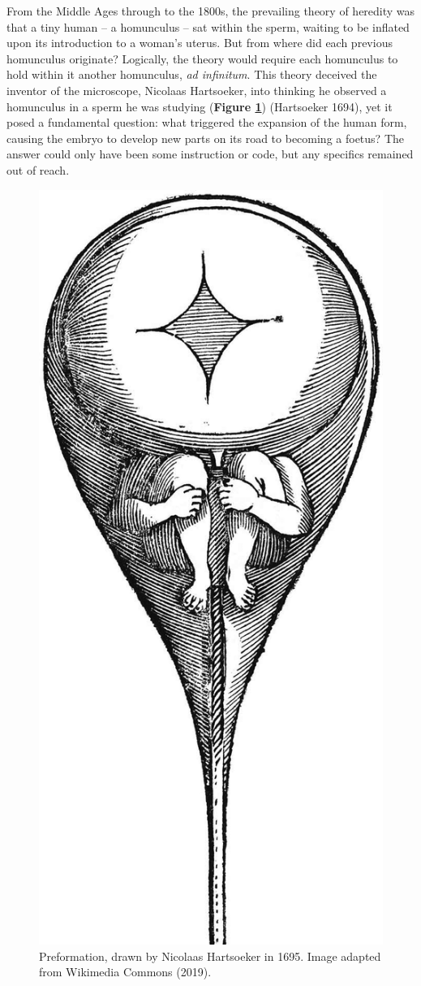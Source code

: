 \documentclass[
]{book}
\begin{document}
From the Middle Ages through to the 1800s, the prevailing theory of heredity was that a tiny human -- a homunculus -- sat within the sperm, waiting to be inflated upon its introduction to a woman's uterus. But from where did each previous homunculus originate? Logically, the theory would require each homunculus to hold within it another homunculus, \emph{ad infinitum}. This theory deceived the inventor of the microscope, Nicolaas Hartsoeker, into thinking he observed a homunculus in a sperm he was studying (\textbf{Figure \ref{fig:homunculus-pic}}) (Hartsoeker 1694), yet it posed a fundamental question: what triggered the expansion of the human form, causing the embryo to develop new parts on its road to becoming a foetus? The answer could only have been some instruction or code, but any specifics remained out of reach.



\begin{figure}

{\centering \includegraphics[width=0.5\linewidth]{figs/introduction/homunculus} 

}

\caption{Preformation, drawn by Nicolaas Hartsoeker in 1695. Image adapted from Wikimedia Commons (2019).}\label{fig:homunculus-pic}
\end{figure}
\end{document}

